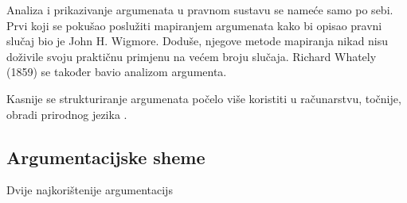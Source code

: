 Analiza i prikazivanje argumenata u pravnom sustavu se nameće samo po sebi.
Prvi koji se pokušao poslužiti mapiranjem argumenata kako bi opisao pravni
slučaj bio je John H. Wigmore. Doduše, njegove metode mapiranja nikad nisu
doživile svoju praktičnu primjenu na većem broju slučaja. Richard Whately
(1859) se također bavio analizom argumenta.

Kasnije se strukturiranje argumenata počelo više koristiti u računarstvu,
točnije, obradi prirodnog jezika \citep{reed2003argumentation}. 

\subsection{Argumentacijske sheme}


Dvije najkorištenije argumentacijs
